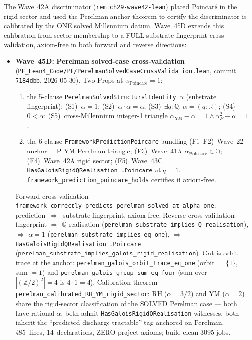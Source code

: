 \begin{remark}[Wave~45D update: framework's CALIBRATION argument against the SOLVED Poincar\'e datum (Perelman 2003) --- forward $+$ reverse cross-validation at $\alpha = 1$, 2026-05-30]\label{rem:ch29-wave45d-lean}
The Wave~42A discriminator (\texttt{rem:ch29-wave42-lean}) placed Poincar\'e in the rigid sector and used the Perelman anchor theorem to certify the discriminator is calibrated by the ONE solved Millennium datum. Wave~45D extends this calibration from sector-membership to a FULL substrate-fingerprint cross-validation, axiom-free in both forward and reverse directions:
\begin{itemize}
  \item \textbf{Wave~45D: Perelman solved-case cross-validation} (\texttt{PF\_Lean4\_Code/PF/PerelmanSolvedCaseCrossValidation.lean}, commit \texttt{7184dbb}, 2026-05-30). Two Props at $\alpha_{\mathrm{Poincar\acute{e}}} = 1$:
  \begin{enumerate}
    \item the 5-clause \texttt{PerelmanSolvedStructuralIdentity $\alpha$} (substrate fingerprint): (S1)~$\alpha = 1$; (S2)~$\alpha \cdot \alpha = \alpha$; (S3)~$\exists q : \mathbb{Q},\, \alpha = (q : \mathbb{R})$; (S4)~$0 < \alpha$; (S5)~cross-Millennium integer-1 triangle $\alpha_{\mathrm{YM}} - \alpha = 1 \wedge \alpha_P^2 - \alpha = 1$.
    \item the 6-clause \texttt{FrameworkPredictionPoincare} bundling (F1--F2)~Wave~22 anchor $+$ P-YM-Perelman triangle; (F3)~Wave~41A $\alpha_{\mathrm{Poincar\acute{e}}} \in \mathbb{Q}$; (F4)~Wave~42A rigid sector; (F5)~Wave~43C \texttt{HasGaloisRigidQRealisation .Poincare} at $q = 1$. \texttt{framework\_prediction\_poincare\_holds} certifies it axiom-free.
  \end{enumerate}
  Forward cross-validation \texttt{framework\_correctly\_predicts\_perelman\_solved\_at\_alpha\_one}: prediction~$\Rightarrow$~substrate fingerprint, axiom-free. Reverse cross-validation: fingerprint $\Rightarrow$ $\mathbb{Q}$-realisation (\texttt{perelman\_substrate\_implies\_Q\_realisation}), $\Rightarrow$ $\alpha = 1$ (\texttt{perelman\_substrate\_implies\_eq\_one}), $\Rightarrow$ \texttt{HasGaloisRigidQRealisation .Poincare} (\texttt{perelman\_substrate\_implies\_galois\_rigid\_realisation}). Galois-orbit trace at the anchor: \texttt{perelman\_galois\_orbit\_trace\_eq\_one} (orbit $= \{1\}$, sum $= 1$) and \texttt{perelman\_galois\_group\_sum\_eq\_four} (sum over $|(\mathbb{Z}/2)^2| = 4$ is $4 \cdot 1 = 4$). Calibration theorem \texttt{perelman\_calibrated\_RH\_YM\_rigid\_sector}: RH ($\alpha = 3/2$) and YM ($\alpha = 2$) share the rigid-sector classification of the SOLVED Perelman case --- both have rational $\alpha$, both admit \texttt{HasGaloisRigidQRealisation} witnesses, both inherit the ``predicted discharge-tractable'' tag anchored on Perelman. 485~lines, 14~declarations, ZERO project axioms; build clean 3095 jobs.

\end{itemize}
\end{remark}
